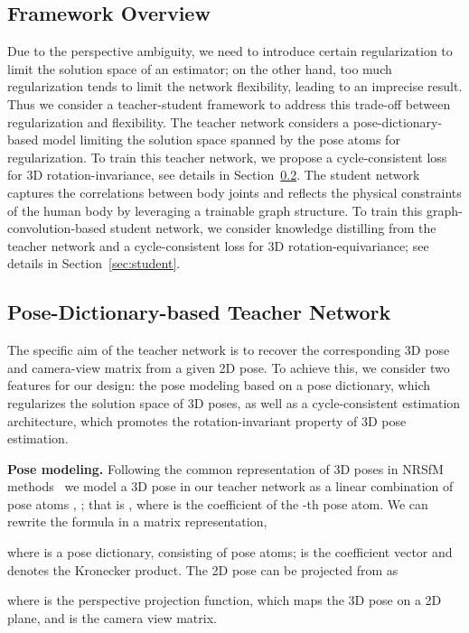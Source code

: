 \documentclass[letterpaper]{article} \usepackage{aaai21}  \usepackage{times}  \usepackage{helvet} \usepackage{courier}  \usepackage[hyphens]{url}  \usepackage{graphicx} \urlstyle{rm} \def\UrlFont{\rm}  \usepackage{natbib}  \usepackage{caption} \frenchspacing  \setlength{\pdfpagewidth}{8.5in}  \setlength{\pdfpageheight}{11in}
\begin{document}
\subsection{Framework Overview}
Due to the perspective ambiguity, we need to introduce 
certain regularization to limit the solution space of an estimator; on the other hand, too much regularization tends to limit the network flexibility, leading to an imprecise result. Thus we consider a teacher-student framework to address this trade-off between regularization and flexibility. The teacher network considers a pose-dictionary-based model limiting the solution space spanned by the pose atoms for regularization. To train this teacher network, we propose a cycle-consistent loss for 3D rotation-invariance, see details in Section~\ref{sec:teacher}. The student network captures the correlations between body joints and reflects the physical constraints of the human body by leveraging a trainable graph structure. To train this graph-convolution-based student network, we consider knowledge distilling from the teacher network and a cycle-consistent loss for 3D rotation-equivariance; see details in Section~\ref{sec:student}.


\subsection{Pose-Dictionary-based Teacher Network}
\label{sec:teacher}
The specific aim of the teacher network is to recover the corresponding 3D pose and camera-view matrix from a given 2D pose. To achieve this, we consider two features for our design: the pose modeling based on a pose dictionary, which regularizes the solution space of 3D poses, as well as a cycle-consistent estimation architecture, which promotes the rotation-invariant property of 3D pose estimation.


\textbf{Pose modeling.}
Following the common representation of 3D poses in NRSfM methods~\cite{bregler2000recovering} we model a 3D pose in our teacher network  as a linear combination of  pose atoms , ; that is , where  is the coefficient of the -th pose atom. We can rewrite the formula in a matrix representation, 

where  is a pose dictionary, consisting of  pose atoms;  is the coefficient vector and  denotes the Kronecker product. The 2D pose can be projected from  as 

where  is the perspective projection function, which maps the 3D pose on a 2D plane, and  is the camera view matrix.
\end{document}
